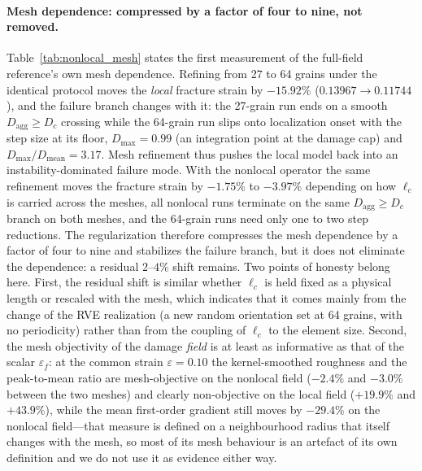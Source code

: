 \documentclass[12pt,a4paper,twocolumn]{article}
\begin{document}
\paragraph{Mesh dependence: compressed by a factor of four to nine, not removed.} Table~\ref{tab:nonlocal_mesh}
states the first measurement of the full-field reference's own mesh dependence. Refining from 27 to 64 grains
under the identical protocol moves the \emph{local} fracture strain by $-15.92\%$ ($0.13967 \to 0.11744$), and
the failure branch changes with it: the 27-grain run ends on a smooth $D_{\mathrm{agg}} \ge D_c$ crossing while
the 64-grain run slips onto localization onset with the step size at its floor, $D_{\max} = 0.99$ (an
integration point at the damage cap) and $D_{\max}/D_{\mathrm{mean}} = 3.17$. Mesh refinement thus pushes the
local model back into an instability-dominated failure mode. With the nonlocal operator the same refinement
moves the fracture strain by $-1.75\%$ to $-3.97\%$ depending on how $\ell_c$ is carried across the meshes, all
nonlocal runs terminate on the same $D_{\mathrm{agg}} \ge D_c$ branch on both meshes, and the 64-grain runs
need only one to two step reductions. The regularization therefore compresses the mesh dependence by a factor
of four to nine and stabilizes the failure branch, but it does not eliminate the dependence: a residual
$2$--$4\%$ shift remains. Two points of honesty belong here. First, the residual shift is similar whether
$\ell_c$ is held fixed as a physical length or rescaled with the mesh, which indicates that it comes mainly
from the change of the RVE realization (a new random orientation set at 64 grains, with no periodicity) rather
than from the coupling of $\ell_c$ to the element size. Second, the mesh objectivity of the damage \emph{field}
is at least as informative as that of the scalar $\varepsilon_f$: at the common strain $\varepsilon = 0.10$ the
kernel-smoothed roughness and the peak-to-mean ratio are mesh-objective on the nonlocal field ($-2.4\%$ and
$-3.0\%$ between the two meshes) and clearly non-objective on the local field ($+19.9\%$ and $+43.9\%$), while
the mean first-order gradient still moves by $-29.4\%$ on the nonlocal field---that measure is defined on a
neighbourhood radius that itself changes with the mesh, so most of its mesh behaviour is an artefact of its own
definition and we do not use it as evidence either way.
\end{document}
